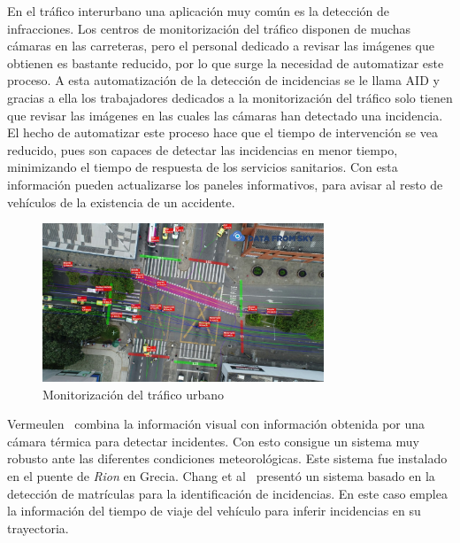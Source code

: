 En el tráfico interurbano una aplicación muy común es la detección de infracciones. Los centros de monitorización del tráfico disponen de muchas cámaras en las carreteras, pero el personal dedicado a revisar las imágenes que obtienen es bastante reducido, por lo que surge la necesidad de automatizar este proceso. A esta automatización de la detección de incidencias se le llama AID  y gracias a ella los trabajadores dedicados  a la monitorización del tráfico solo tienen que revisar las imágenes en las  cuales las cámaras han detectado una incidencia. El hecho de automatizar este proceso hace que el tiempo de intervención se vea reducido, pues son capaces de detectar las incidencias en menor tiempo, minimizando el tiempo de respuesta de los servicios sanitarios. Con esta información pueden actualizarse los paneles informativos, para avisar al resto de vehículos de la existencia de un accidente.

\begin{figure}[H]
  \begin{center}
    \includegraphics[width=0.75\textwidth]{figures/Introduccion/monitorizacion_trafico_urbano.jpg}
		\caption{Monitorización del tráfico urbano}
		\label{fig.monitorizacion_trafico_urbano}
		\end{center}
\end{figure}

Vermeulen~\cite{automatic_incident} combina la información visual con información obtenida por una cámara térmica  para detectar incidentes. Con esto consigue un sistema muy robusto ante las diferentes condiciones meteorológicas. Este sistema fue instalado en el puente de \textit{Rion} en Grecia. Chang et al~\cite{new_traffic_incident} presentó un sistema basado en la detección de matrículas para la identificación de incidencias. En este caso emplea la información del tiempo de viaje del vehículo para inferir incidencias en su trayectoria.

